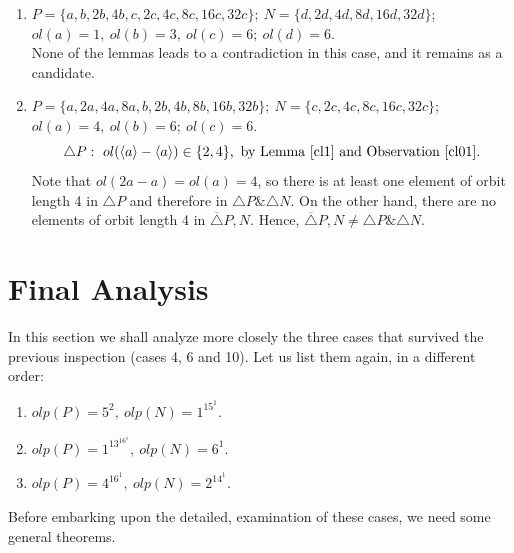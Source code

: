 {{{\begin{enumerate}
    
  \item  $ P=\{a,b,2b,4b,c,2c,4c,8c,16c,32c\}; \  N=\{d,2d,4d,8d,16d,32d\} $; \\  
	 $ ol(a)=1, \ ol(b)=3, \  ol(c)=6; \  ol(d)=6 $.\\
	 None of the lemmas leads to a contradiction in this case, and it remains as 
	 a candidate.

  \item  $ P=\{a,2a,4a,8a,b,2b,4b,8b,16b,32b\}; \  N=\{c,2c,4c,8c,16c,32c\} $; \\  
	 $ ol(a)=4, \ ol(b)=6; \  ol(c)=6 $.\\
	 $$\triangle P: \ 
	 ol(\langle a \rangle - \langle a \rangle) \in \{2,4\}, \mbox{ by Lemma \ref{cl1} and Observation \ref{cl01}}.$$
	 Note that $ol(2a-a)=ol(a)=4$, so there is at least one element of orbit length
	 4 in $\triangle P $ and therefore in $\triangle P \& \triangle N $. On the other hand,  
	 there are no elements of orbit length 4 in $ \overline{\triangle} P,N$.
	 Hence, $ \overline{\triangle} P,N \neq \triangle P \& \triangle N $.  


  

\end{enumerate}


\section{Final Analysis} \label{sec6}

In this section we shall analyze more closely the three cases that survived 
the previous inspection (cases 4, 6 and 10). Let us list them again, in a 
different order: 
\begin{enumerate}
      \item $olp(P)=5^{2}, \ olp(N)=1^15^1$.
      \item $olp(P)=1^13^16^1, \ olp(N)=6^1$.
      \item $olp(P)=4^16^1, \ olp(N)=2^14^1$. 
\end{enumerate}

Before embarking upon the detailed, examination of these cases, we need some 
general theorems. 

}}}
